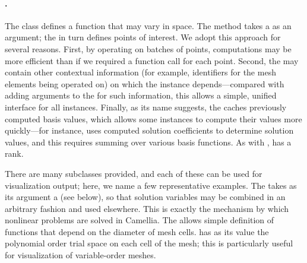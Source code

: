 \paragraph{.}  The  class defines a function that may vary in space.  The  method takes a  as an argument; the  in turn defines points of interest.  We adopt this approach for several reasons.  First, by operating on batches of points, computations may be more efficient than if we required a function call for each point.  Second, the  may contain other contextual information (for example, identifiers for the mesh elements being operated on) on which the  instance depends---compared with adding arguments to the  for such information, this allows a simple, unified interface for all  instances.  Finally, as its name suggests, the  caches previously computed basis values, which allows some  instances to compute their values more quickly---for instance,  uses computed solution coefficients to determine solution values, and this requires summing over various basis functions.  As with ,  has a rank.

There are many  subclasses provided, and each of these can be used for visualization output; here, we name a few representative examples.  The  takes as its argument a  (see below), so that solution variables may be combined in an arbitrary fashion and used elsewhere.  This is exactly the mechanism by which nonlinear problems are solved in Camellia.  The  allows simple definition of functions that depend on the diameter of mesh cells.   has as its value the polynomial order trial space on each cell of the mesh; this is particularly useful for visualization of variable-order meshes.

